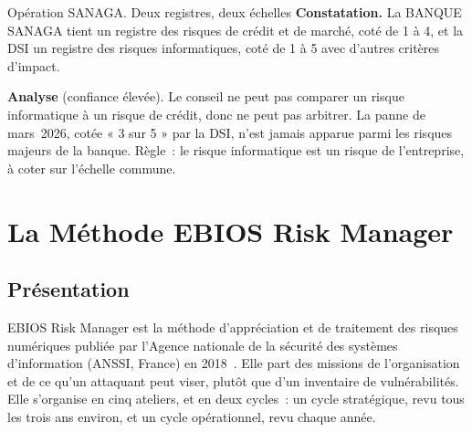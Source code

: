 \begin{boxscenario}{Opération SANAGA. Deux registres, deux échelles}
\textbf{Constatation.} La BANQUE SANAGA tient un registre des risques de
crédit et de marché, coté de 1 à 4, et la DSI un registre des risques
informatiques, coté de 1 à 5 avec d'autres critères d'impact.

\medskip
\textbf{Analyse} (confiance élevée). Le conseil ne peut pas comparer un
risque informatique à un risque de crédit, donc ne peut pas arbitrer. La
panne de mars~2026, cotée « 3 sur 5 » par la DSI, n'est jamais apparue
parmi les risques majeurs de la banque. Règle~: le risque informatique est
un risque de l'entreprise, à coter sur l'échelle commune.
\end{boxscenario}

\section{La Méthode EBIOS Risk Manager}
\label{sec:c05-ebios}

\subsection{Présentation}

EBIOS Risk Manager est la méthode d'appréciation et de traitement des
risques numériques publiée par l'Agence nationale de la sécurité des
systèmes d'information (ANSSI, France) en 2018~\cite{anssi2018ebios}. Elle
part des missions de l'organisation et de ce qu'un attaquant peut viser,
plutôt que d'un inventaire de vulnérabilités. Elle s'organise en cinq
ateliers, et en deux cycles~: un cycle stratégique, revu tous les trois ans
environ, et un cycle opérationnel, revu chaque année.

